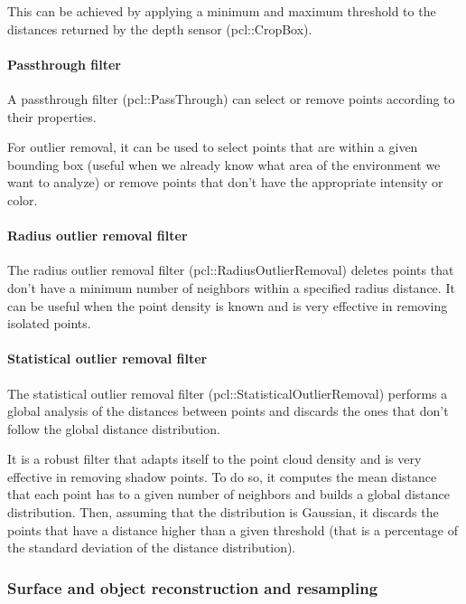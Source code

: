 This can be achieved by applying a minimum and maximum threshold to the distances returned by the depth sensor (pcl::CropBox).


\paragraph{Passthrough filter}

A passthrough filter (pcl::PassThrough) can select or remove points according to their properties.

For outlier removal, it can be used to select points that are within a given bounding box (useful when we already know what area of the environment we want to analyze) or remove points that don't have the appropriate intensity or color.


\paragraph{Radius outlier removal filter}

The radius outlier removal filter (pcl::RadiusOutlierRemoval) deletes points that don't have a minimum number of neighbors within a specified radius distance. It can be useful when the point density is known and is very effective in removing isolated points.


\paragraph{Statistical outlier removal filter}

The statistical outlier removal filter (pcl::StatisticalOutlierRemoval) \cite{Rusu2010a} performs a global analysis of the distances between points and discards the ones that don't follow the global distance distribution.

It is a robust filter that adapts itself to the point cloud density and is very effective in removing shadow points. To do so, it computes the mean distance that each point has to a given number of neighbors and builds a global distance distribution. Then, assuming that the distribution is Gaussian, it discards the points that have a distance higher than a given threshold (that is a percentage of the standard deviation of the distance distribution).


\subsubsection{Surface and object reconstruction and resampling}\label{subsec:localization_system_surface-reconstruction-resampling}

